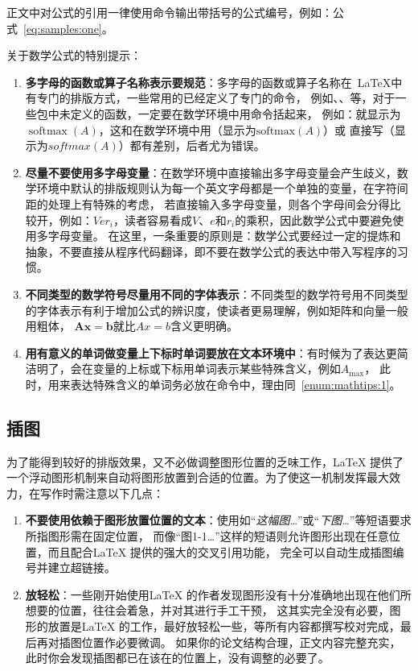 正文中对公式的引用一律使用命令输出带括号的公式编号，例如：公式~\eqref{eq:samples:one}。

关于数学公式的特别提示：
\begin{enumerate}
  \item \textbf{多字母的函数或算子名称表示要规范}：多字母的函数或算子名称在~\LaTeX{}中有专门的排版方式，一些常用的已经定义了专门的命令，
        例如、、等，对于一些包中未定义的函数，一定要在数学环境中用命令括起来，
        例如：就显示为$\operatorname{softmax}(A)$，这和在数学环境中用（显示为$\text{softmax}(A)$）或
        直接写（显示为$softmax(A)$）都有差别，后者尤为错误。
  \item \textbf{尽量不要使用多字母变量}：在数学环境中直接输出多字母变量会产生歧义，数学环境中默认的排版规则认为每一个英文字母都是一个单独的变量，在字符间距的处理上有特殊的考虑，
        若直接输入多字母变量，则各个字母间会分得比较开，例如：$Ver_i$，读者容易看成$V$、$e$和$r_i$的乘积，因此数学公式中要避免使用多字母变量。
        在这里，一条重要的原则是：数学公式要经过一定的提炼和抽象，不要直接从程序代码翻译，即不要在数学公式的表达中带入写程序的习惯。\label{enum:mathtips:1}
  \item \textbf{不同类型的数学符号尽量用不同的字体表示}：不同类型的数学符号用不同类型的字体表示有利于增加公式的辨识度，使读者更易理解，例如矩阵和向量一般用粗体，
        $\mathbf{Ax}=\mathbf{b}$就比$Ax=b$含义更明确。
  \item \textbf{用有意义的单词做变量上下标时单词要放在文本环境中}：有时候为了表达更简洁明了，会在变量的上标或下标用单词表示某些特殊含义，例如$A_\text{max}$，
        此时，用来表达特殊含义的单词务必放在命令中，理由同~\ref{enum:mathtips:1}。
\end{enumerate}

\subsection{插图}
为了能得到较好的排版效果，又不必做调整图形位置的乏味工作，\LaTeX{} 提供了一个浮动图形机制来自动将图形放置到合适的位置。为了使这一机制发挥最大效力，在写作时需注意以下几点：
\begin{enumerate}
	\item \textbf{不要使用依赖于图形放置位置的文本}：使用如“\emph{这幅图…}”或“\emph{下图…}”等短语要求所指图形需在固定位置，
	      而像“{\kaishu 图1-1…}”这样的短语则允许图形出现在任意位置，而且配合\LaTeX{} 提供的强大的交叉引用功能，
	      完全可以自动生成插图编号并建立超链接。
	\item \textbf{放轻松}：一些刚开始使用\LaTeX{} 的作者发现图形没有十分准确地出现在他们所想要的位置，往往会着急，并对其进行手工干预，
	      这其实完全没有必要，图形的放置是\LaTeX{} 的工作，最好放轻松一些，等所有内容都撰写校对完成，最后再对插图位置作必要微调。
	      如果你的论文结构合理，正文内容完整充实，此时你会发现插图都已在该在的位置上，没有调整的必要了。
\end{enumerate}

